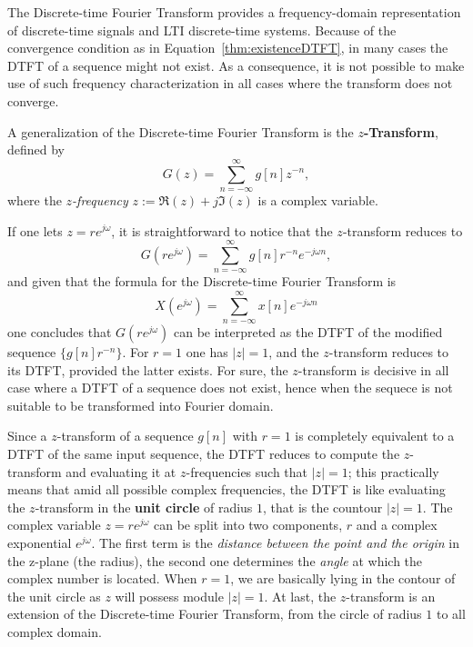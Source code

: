\documentclass[\documentfontsize, twocolumn]{\classname}
\begin{document}
The Discrete-time Fourier Transform provides a frequency-domain representation of discrete-time signals and LTI dis\-cre\-te-time systems. Because of the convergence condition as in Equation~\ref{thm:existenceDTFT}, in many cases the DTFT of a sequence might not exist. As a consequence, it is not possible to make use of such frequency characterization in all cases where the transform does not converge.

A generalization of the Discrete-time Fourier Transform is the
\textbf{$z$-Transform}, defined by
\begin{equation}\label{eqn:zTransform}
    G(z) = \sum_{n=-\infty}^\infty g[n] z^{-n},
\end{equation}
where the \emph{$z$-frequency} $z := \Re{(z)} + j \Im{(z)}$ is a complex
variable.

If one lets $z = re^{j\omega}$, it is straightforward to notice that the
$z$-transform reduces to
\begin{equation}\label{eqn:zTransformInterpretation}
    G(re^{j\omega}) = \sum_{n=-\infty}^\infty g[n] r^{-n} e^{-j\omega n},
\end{equation}
and given that the formula for the Discrete-time Fourier Transform is
\[
    X(e^{j\omega}) = \sum_{n=-\infty}^\infty x[n]e^{-j\omega n}
\]
one concludes that $G(re^{j\omega})$ can be interpreted as the DTFT of the modified sequence $\{g[n]r^{-n}\}$. For $r = 1$ one has $|z| = 1$, and the $z$-transform reduces to its DTFT, provided the latter exists. For sure, the $z$-transform is decisive in all case where a DTFT of a sequence does not exist, hence when the sequece is not suitable to be transformed into Fourier domain.

Since a $z$-transform of a sequence $g[n]$ with $r = 1$ is completely equivalent to a DTFT of the same input sequence, the DTFT reduces to compute the $z$-transform and evaluating it at $z$-frequencies such that $|z| = 1$; this practically means that amid all possible complex frequencies, the DTFT is like evaluating the $z$-transform in the \textbf{unit circle} of radius $1$, that is the countour $|z| = 1$. The complex variable $z = re^{j\omega}$ can be split into two components, $r$ and a complex exponential $e^{j\omega}$. The first term is the \emph{distance between the point and the origin} in the z-plane (the radius), the second one determines the \emph{angle} at which the complex number is located. When $r=1$, we are basically lying in the contour of the unit circle as $z$ will possess module $|z|=1$. At last, the $z$-transform is an extension of the Discrete-time Fourier Transform, from the circle of radius $1$ to all complex domain.
\end{document}
